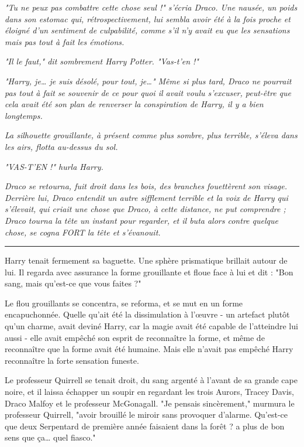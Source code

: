 \emph{"Tu ne peux pas combattre cette chose seul !" s'écria Draco. Une nausée, un poids dans son estomac qui, rétrospectivement, lui sembla avoir été à la fois proche et éloigné d'un sentiment de culpabilité, comme s'il n'y avait eu que les sensations mais pas tout à fait les émotions.} 

\emph{"Il le faut," dit sombrement Harry Potter. "Vas-t'en !"} 

\emph{"Harry, je… je suis désolé, pour tout, je…" Même si plus tard, Draco ne pourrait pas tout à fait se souvenir de ce pour quoi il avait voulu s'excuser, peut-être que cela avait été son plan de renverser la conspiration de Harry, il y a bien longtemps.} 

\emph{La silhouette grouillante, à présent comme plus sombre, plus terrible, s'éleva dans les airs, flotta au-dessus du sol.} 

\emph{"VAS-T'EN !" hurla Harry.} 

\emph{Draco se retourna, fuit droit dans les bois, des branches fouettèrent son visage. Derrière lui, Draco entendit un autre sifflement terrible et la voix de Harry qui s'élevait, qui criait une chose que Draco, à cette distance, ne put comprendre ; Draco tourna la tête un instant pour regarder, et il buta alors contre quelque chose, se cogna FORT la tête et s'évanouit.} 
\par\noindent\rule{\textwidth}{0.4pt}
Harry tenait fermement sa baguette. Une sphère prismatique brillait autour de lui. Il regarda avec assurance la forme grouillante et floue face à lui et dit : "Bon sang, mais qu'est-ce que vous faites ?"

Le flou grouillants se concentra, se reforma, et se mut en un forme encapuchonnée. Quelle qu'ait été la dissimulation à l'œuvre - un artefact plutôt qu'un charme, avait deviné Harry, car la magie avait été capable de l'atteindre lui aussi - elle avait empêché son esprit de reconnaître la forme, et même de reconnaître que la forme avait été humaine. Mais elle n'avait pas empêché Harry reconnaître la forte sensation funeste.

Le professeur Quirrell se tenait droit, du sang argenté à l'avant de sa grande cape noire, et il laissa échapper un soupir en regardant les trois Aurors, Tracey Davis, Draco Malfoy et le professeur McGonagall. "Je pensais sincèrement," murmura le professeur Quirrell, "avoir brouillé le miroir sans provoquer d'alarme. Qu'est-ce que deux Serpentard de première année faisaient dans la forêt ? a plus de bon sens que ça… quel fiasco."

